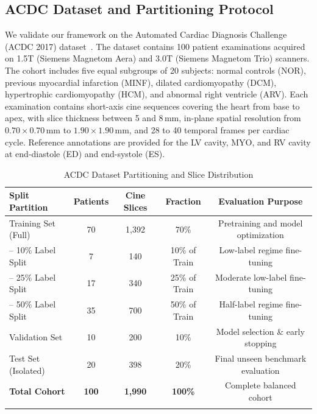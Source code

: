 \documentclass[pdflatex,sn-mathphys]{sn-jnl}
\theoremstyle{thmstyleone}
\theoremstyle{thmstyletwo}
\theoremstyle{thmstylethree}
\begin{document}
\subsection{ACDC Dataset and Partitioning Protocol}
We validate our framework on the Automated Cardiac Diagnosis Challenge (ACDC 2017) dataset~\cite{bernard2018deep}. The dataset contains 100 patient examinations acquired on 1.5T (Siemens Magnetom Aera) and 3.0T (Siemens Magnetom Trio) scanners. The cohort includes five equal subgroups of 20 subjects: normal controls (NOR), previous myocardial infarction (MINF), dilated cardiomyopathy (DCM), hypertrophic cardiomyopathy (HCM), and abnormal right ventricle (ARV). Each examination contains short-axis cine sequences covering the heart from base to apex, with slice thickness between 5 and 8\,mm, in-plane spatial resolution from $0.70 \times 0.70$\,mm to $1.90 \times 1.90$\,mm, and 28 to 40 temporal frames per cardiac cycle. Reference annotations are provided for the LV cavity, MYO, and RV cavity at end-diastole (ED) and end-systole (ES).

\begin{table}[htbp]
\caption{ACDC Dataset Partitioning and Slice Distribution}%
\label{tab:splits}
\renewcommand{\arraystretch}{1.2}
\centering
\small
\setlength{\tabcolsep}{5pt}
\begin{tabular}{@{}lcccc@{}}
\toprule
\textbf{Split Partition} & \textbf{Patients} & \textbf{Cine Slices} & \textbf{Fraction} & \textbf{Evaluation Purpose} \\
\midrule
Training Set (Full)      & 70                & 1,392                & 70\%              & Pretraining and model optimization \\
\quad -- 10\% Label Split & 7                 & 140                  & 10\% of Train     & Low-label regime fine-tuning \\
\quad -- 25\% Label Split & 17                & 340                  & 25\% of Train     & Moderate low-label fine-tuning \\
\quad -- 50\% Label Split & 35                & 700                  & 50\% of Train     & Half-label regime fine-tuning \\
Validation Set           & 10                & 200                  & 10\%              & Model selection \& early stopping \\
Test Set (Isolated)      & 20                & 398                  & 20\%              & Final unseen benchmark evaluation \\
\midrule
\textbf{Total Cohort}    & \textbf{100}      & \textbf{1,990}       & \textbf{100\%}    & Complete balanced cohort \\
\botrule
\end{tabular}
\end{table}
\end{document}
